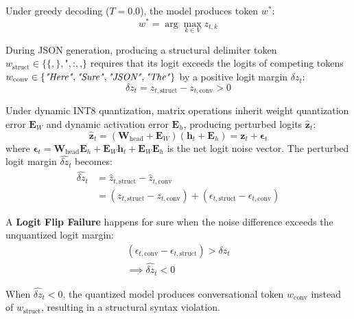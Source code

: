\documentclass[10pt,journal,compsoc]{IEEEtran}
\begin{document}
Under greedy decoding ($T=0.0$), the model produces token $w^*$:
\begin{equation}
    w^* = \arg\max_{k \in V} z_{t,k}
\end{equation}

During JSON generation, producing a structural delimiter token $w_{\text{struct}} \in \{\texttt{\{}, \texttt{\}}, \texttt{"}, \texttt{:}, \texttt{,}\}$ requires that its logit exceeds the logits of competing tokens $w_{\text{conv}} \in \{\text{\emph{"Here"}}, \text{\emph{"Sure"}}, \text{\emph{"JSON"}}, \text{\emph{"The"}}\}$ by a positive logit margin $\delta z_t$:
\begin{equation}
    \delta z_t = z_{t, \text{struct}} - z_{t, \text{conv}} > 0
\end{equation}

Under dynamic INT8 quantization, matrix operations inherit weight quantization error $\mathbf{E}_W$ and dynamic activation error $\mathbf{E}_h$, producing perturbed logits $\hat{\mathbf{z}}_t$:
\begin{equation}
    \hat{\mathbf{z}}_t = (\mathbf{W}_{\text{head}} + \mathbf{E}_W)(\mathbf{h}_t + \mathbf{E}_h) = \mathbf{z}_t + \mathbf{\epsilon}_t
\end{equation}
where $\mathbf{\epsilon}_t = \mathbf{W}_{\text{head}}\mathbf{E}_h +\allowbreak \mathbf{E}_W\mathbf{h}_t +\allowbreak \mathbf{E}_W\mathbf{E}_h$ is the net logit noise vector. The perturbed logit margin $\widehat{\delta z}_t$ becomes:
\begin{equation}
\begin{split}
    \widehat{\delta z}_t &= \hat{z}_{t, \text{struct}} - \hat{z}_{t, \text{conv}} \\
    &= (z_{t, \text{struct}} - z_{t, \text{conv}}) + (\epsilon_{t, \text{struct}} - \epsilon_{t, \text{conv}})
\end{split}
\end{equation}

A \textbf{Logit Flip Failure} happens for sure when the noise difference exceeds the unquantized logit margin:
\begin{equation}
\begin{split}
    (\epsilon_{t, \text{conv}} - \epsilon_{t, \text{struct}}) > \delta z_t \\
    \implies \widehat{\delta z}_t < 0
\end{split}
\end{equation}

When $\widehat{\delta z}_t < 0$, the quantized model produces conversational token $w_{\text{conv}}$ instead of $w_{\text{struct}}$, resulting in a structural syntax violation.
\end{document}
